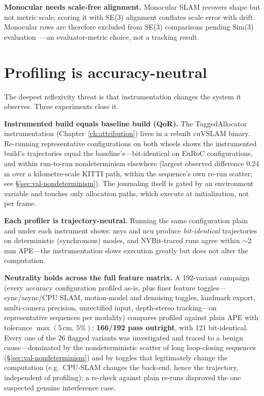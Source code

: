 \textbf{Monocular needs scale-free alignment.} Monocular SLAM recovers shape
but not metric scale; scoring it with SE(3) alignment conflates scale error
with drift. Monocular rows are therefore excluded from SE(3) comparisons
pending Sim(3) evaluation~\cite{umeyama1991}---an evaluator-metric choice,
not a tracking result.

\section{Profiling is accuracy-neutral}
\label{sec:val-neutrality}

The deepest reflexivity threat is that instrumentation changes the system it
observes. Three experiments close it.

\textbf{Instrumented build equals baseline build (QoR).} The TaggedAllocator
instrumentation (Chapter~\ref{ch:attribution}) lives in a rebuilt cuVSLAM
binary. Re-running representative configurations on both wheels shows the
instrumented build's trajectories equal the baseline's---bit-identical on
EuRoC configurations, and within run-to-run nondeterminism elsewhere
(largest observed difference 0.24\,m over a kilometre-scale KITTI path,
within the sequence's own re-run scatter; see
\S\ref{sec:val-nondeterminism}). The journaling itself is gated by an
environment variable and touches only allocation paths, which execute at
initialization, not per frame.

\textbf{Each profiler is trajectory-neutral.} Running the same configuration
plain and under each instrument shows: nsys and ncu produce
\emph{bit-identical} trajectories on deterministic (synchronous) modes, and
NVBit-traced runs agree within $\sim$2\,mm APE---the instrumentation slows
execution greatly but does not alter the computation.

\textbf{Neutrality holds across the full feature matrix.} A 192-variant
campaign (every accuracy configuration profiled as-is, plus finer feature
toggles---sync/async/CPU SLAM, motion-model and denoising toggles,
landmark export, multi-camera precision, unrectified input, depth-stereo
tracking---on representative sequences per modality) compares profiled
against plain APE with tolerance $\max(5\,\text{cm},\,5\%)$: \textbf{166/192
pass outright}, with 121 bit-identical. Every one of the 26 flagged variants
was investigated and traced to a benign cause---dominated by the
nondeterministic scatter of long loop-closing sequences
(\S\ref{sec:val-nondeterminism}) and by toggles that legitimately change the
computation (e.g.\ CPU-SLAM changes the back-end, hence the trajectory,
independent of profiling); a re-check against plain re-runs disproved the
one suspected genuine interference case.

